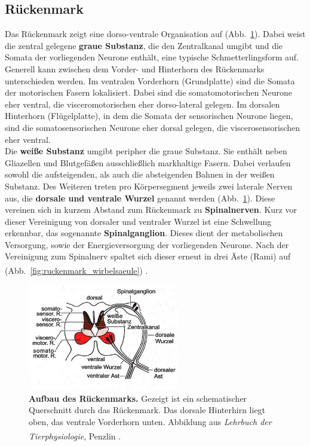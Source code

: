 \subsection{Rückenmark}
\label{subsec:Rueckenmark} 

Das Rückenmark zeigt eine dorso-ventrale Organisation auf (Abb.~\ref{fig:ruckenmark_schema}). Dabei weist die zentral gelegene \textbf{graue Substanz}, die den Zentralkanal umgibt und die Somata der vorliegenden Neurone enthält, eine typische Schmetterlingsform auf. Generell kann zwischen dem Vorder- und Hinterhorn des Rückenmarks unterschieden werden. Im ventralen Vorderhorn (Grundplatte) sind die Somata der motorischen Fasern lokalisiert. Dabei sind die somatomotorischen Neurone eher ventral, die visceromotorischen eher dorso-lateral gelegen. Im dorsalen Hinterhorn (Flügelplatte), in dem die Somata der sensorischen Neurone liegen, sind die somatosensorischen Neurone eher dorsal gelegen, die viscerosensorischen eher ventral.\\

\noindent Die \textbf{weiße Substanz} umgibt peripher die graue Substanz. Sie enthält neben Gliazellen und Blutgefäßen ausschließlich markhaltige Fasern. Dabei verlaufen sowohl die aufsteigenden, als auch die absteigenden Bahnen in der weißen Substanz. Des Weiteren treten pro Körpersegment jeweils zwei laterale Nerven aus, die \textbf{dorsale und ventrale Wurzel} genannt werden (Abb.~\ref{fig:ruckenmark_schema}). Diese vereinen sich in kurzem Abstand zum Rückenmark zu \textbf{Spinalnerven}. Kurz vor dieser Vereinigung von dorsaler und ventraler Wurzel ist eine Schwellung erkennbar, das sogenannte \textbf{Spinalganglion}. Dieses dient der metabolischen Versorgung, sowie der Energieversorgung der vorliegenden Neurone. Nach der Vereinigung zum Spinalnerv spaltet sich dieser erneut in drei Äste (Rami) auf (Abb.~\ref{fig:ruckenmark_wirbelsaeule}) \textsuperscript{\cite[Kap.~14]{penzlin2005tierphys}}.

\begin{figure}[H]
     \centering
     \includegraphics[width=0.59\textwidth]{pictures/Bilder_Jule/Andere/rueckenmark_schema.jpg}
     \caption[Aufbau des Rückenmarks]{\textbf{Aufbau des Rückenmarks.} Gezeigt ist ein schematischer Querschnitt durch das Rückenmark. Das dorsale Hinterhirn liegt oben, das ventrale Vorderhorn unten. Abbildung aus \textit{Lehrbuch der Tierphysiologie}, Penzlin \textsuperscript{\cite[Kap.~14]{penzlin2005tierphys}}.}
     \label{fig:ruckenmark_schema}
 \end{figure}{}

